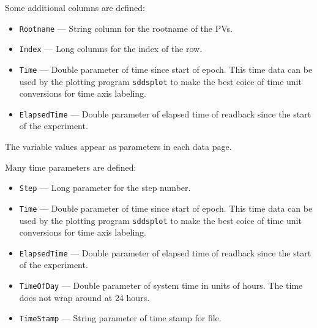 \begin{itemize}
Some additional columns are defined:
\begin{itemize}
   \item {\verb+Rootname+} --- String column for the rootname of the PVs.
   \item {\verb+Index+} --- Long columns for the index of the row.
   \item {\tt Time} --- Double parameter of time since start of epoch. This time data can be used by
        the plotting program {\verb+sddsplot+} to make the best coice of time unit conversions
        for time axis labeling.
   \item {\tt ElapsedTime} --- Double parameter of elapsed time of readback since the start of the experiment.
\end{itemize}

The variable values appear as parameters in each data page.

Many time parameters are defined:
\begin{itemize}
   \item {\verb+Step+} --- Long parameter for the step number.
   \item {\tt Time} --- Double parameter of time since start of epoch. This time data can be used by
        the plotting program {\verb+sddsplot+} to make the best coice of time unit conversions
        for time axis labeling.
   \item {\tt ElapsedTime} --- Double parameter of elapsed time of readback since the start of the experiment.
   \item {\tt TimeOfDay} --- Double parameter of system time in units of hours. 
                The time does not wrap around at 24 hours.
   \item {\tt TimeStamp} --- String parameter of time stamp for file.
\end{itemize}

\end{itemize}

